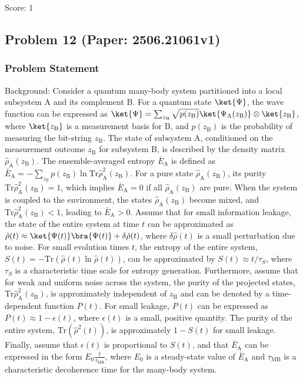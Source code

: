 \documentclass[10pt]{article}
\begin{document}
Score: 1

\newpage
\subsection*{Problem 12 (Paper: 2506.21061v1)}
\subsubsection*{Problem Statement}
Background:
Consider a quantum many-body system partitioned into a local subsystem A and its complement B. For a quantum state $\ket{\Psi}$, the wave function can be expressed as $\ket{\Psi} = \sum _{z_\mathrm{B}}\sqrt{p(z_\mathrm{B})}\ket{\Psi_{\mathrm{A}}(z_\mathrm{B})}\otimes \ket{z_\mathrm{B}}$, where $\ket{z_{\mathrm{B}}}$ is a measurement basis for B, and $p(z_\mathrm{B})$ is the probability of measuring the bit-string $z_\mathrm{B}$. The state of subsystem A, conditioned on the measurement outcome $z_\mathrm{B}$ for subsystem B, is described by the density matrix $\hat \rho_{\mathrm{A}}(z_\mathrm{B})$. The ensemble-averaged entropy $\bar E_\mathrm{A}$ is defined as $\bar E_\mathrm{A} = -\sum_{z_\mathrm{B}} p(z_\mathrm{B})\ln\text{Tr}\hat \rho_{\mathrm{A}}^2(z_\mathrm{B})$. For a pure state $\hat \rho_{\mathrm{A}}(z_\mathrm{B})$, its purity $\text{Tr}\hat \rho_{\mathrm{A}}^2(z_\mathrm{B}) = 1$, which implies $\bar E_\mathrm{A} = 0$ if all $\hat \rho_{\mathrm{A}}(z_\mathrm{B})$ are pure. When the system is coupled to the environment, the states $\hat \rho_{\mathrm{A}}(z_\mathrm{B})$ become mixed, and $\text{Tr}\hat \rho_{\mathrm{A}}^2(z_\mathrm{B}) < 1$, leading to $\bar E_\mathrm{A} > 0$. Assume that for small information leakage, the state of the entire system at time $t$ can be approximated as $\hat \rho(t) \approx \ket{\Psi(t)}\bra{\Psi(t)} + \delta \hat \rho(t)$, where $\delta \hat \rho(t)$ is a small perturbation due to noise. For small evolution times $t$, the entropy of the entire system, $S(t) = -\text{Tr}(\hat \rho(t)\ln \hat \rho(t))$, can be approximated by $S(t) \approx t/\tau_S$, where $\tau_S$ is a characteristic time scale for entropy generation. Furthermore, assume that for weak and uniform noise across the system, the purity of the projected states, $\text{Tr}\hat \rho_{\mathrm{A}}^2(z_\mathrm{B})$, is approximately independent of $z_\mathrm{B}$ and can be denoted by a time-dependent function $P(t)$. For small leakage, $P(t)$ can be expressed as $P(t) \approx 1 - \epsilon(t)$, where $\epsilon(t)$ is a small, positive quantity. The purity of the entire system, $\text{Tr}(\hat \rho^2(t))$, is approximately $1 - S(t)$ for small leakage. Finally, assume that $\epsilon(t)$ is proportional to $S(t)$, and that $\bar E_\mathrm{A}$ can be expressed in the form $E_0 \frac{t}{\tau_\mathrm{MB}}$, where $E_0$ is a steady-state value of $\bar E_\mathrm{A}$ and $\tau_{\text{MB}}$ is a characteristic decoherence time for the many-body system.
\end{document}
